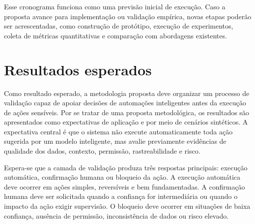 \documentclass[12pt]{article}
\begin{document}
\begin{table}[htbp]
\centering
\caption{Cronograma esperado da pesquisa}
\label{tab:cronograma-pesquisa}
\footnotesize
{}
\end{table}

Esse cronograma funciona como uma previsão inicial de execução. Caso a proposta avance para implementação ou validação empírica, novas etapas poderão ser acrescentadas, como construção de protótipo, execução de experimentos, coleta de métricas quantitativas e comparação com abordagens existentes.



\section{Resultados esperados}

Como resultado esperado, a metodologia proposta deve organizar um processo de validação capaz de apoiar decisões de automações inteligentes antes da execução de ações sensíveis. Por se tratar de uma proposta metodológica, os resultados são apresentados como expectativas de aplicação e por meio de cenários sintéticos. A expectativa central é que o sistema não execute automaticamente toda ação sugerida por um modelo inteligente, mas avalie previamente evidências de qualidade dos dados, contexto, permissão, rastreabilidade e risco.

Espera-se que a camada de validação produza três respostas principais: execução automática, confirmação humana ou bloqueio da ação. A execução automática deve ocorrer em ações simples, reversíveis e bem fundamentadas. A confirmação humana deve ser solicitada quando a confiança for intermediária ou quando o impacto da ação exigir supervisão. O bloqueio deve ocorrer em situações de baixa confiança, ausência de permissão, inconsistência de dados ou risco elevado.
\end{document}

